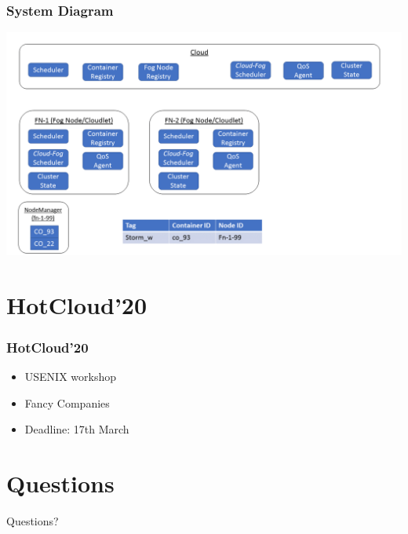\documentclass{beamer}
\begin{document}
\begin{frame}
	\frametitle{System Diagram}
	\includegraphics[height=.85\textheight,width=\textwidth]{img/system_diagram}
\end{frame}


\section{HotCloud'20}
\begin{frame}
	\frametitle{HotCloud'20}
	\begin{itemize}
		\item USENIX workshop
		\item Fancy Companies
		\item Deadline: 17th March
	\end{itemize}
\end{frame}

\section{Questions}
\begin{frame}
	\centering Questions?	
\end{frame}
\end{document}
